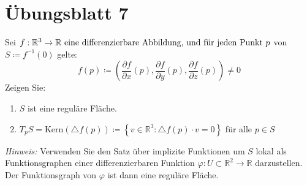 \section{Übungsblatt 7}
\setcounter{problemcounter}{0}

\begin{assignment}
Sei \(f: \mathbb{R}^3  \to \mathbb{R}$ eine differenzierbare Abbildung, und für jeden Punkt \( p \) von \( S \coloneqq f^{ -1 }(0)\) gelte:
\begin{equation*}
    f(p) \coloneqq \left(\frac{\partial f}{\partial x}(p), 
    \frac{\partial f}{\partial y}(p), 
    \frac{\partial f}{\partial z}(p) \right) \neq 0
\end{equation*}
Zeigen Sie: 
\begin{enumerate}[label=(\alph*)] 
  \item $ S $ ist eine reguläre Fläche.
  \item $T_p S = \text{Kern}(\triangle f(p)) \coloneqq \left\{ v \in \mathbb{R}^3 : \triangle f(p) \cdot v = 0 \right\}$ für alle $ p \in S$
\end{enumerate}
\emph{Hinweis:} Verwenden Sie den Satz über implizite Funktionen um $ S $ lokal als Funktionsgraphen einer differenzierbaren Funktion $ \varphi : U \subset \mathbb{R}^2 \to \mathbb{R}$ darzustellen. Der Funktionsgraph von $\varphi$ ist dann eine reguläre Fläche.
\end{assignment}
